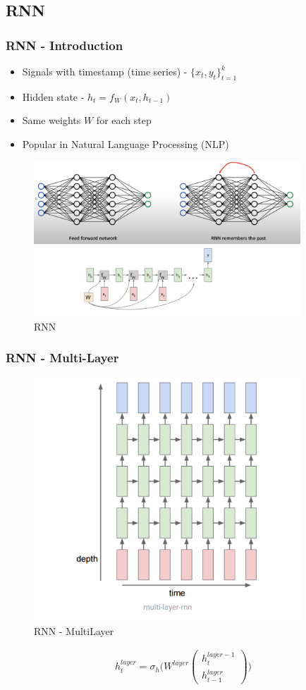 \documentclass[12pt]{report}
\begin{document}
\newpage
\subsection{RNN}

\subsubsection{RNN - Introduction}
\begin{itemize}
	\item Signals with timestamp (time series) - $\{x_t, y_t \}_{t=1}^k$
	\item Hidden state - $h_t = f_{W}(x_t, h_{t-1})$
	\item Same weights $W$ for each step
	\item Popular in Natural Language Processing (NLP)
\end{itemize}
\begin{figure}[H]\centering\includegraphics[width=10cm]{RNN.png}\caption{RNN}\end{figure}


\subsubsection{RNN - Multi-Layer}
\begin{figure}[H]\centering\includegraphics[width=10cm]{RNN_MULTI.png}\caption{RNN - MultiLayer}\end{figure}
\begin{align*}
	h_t^{layer} = \sigma_h \bigg(W^{layer} \begin{pmatrix}
		h_{t}^{layer-1} \\ h_{t-1}^{layer}
	\end{pmatrix} \bigg)
\end{align*}
\end{document}
